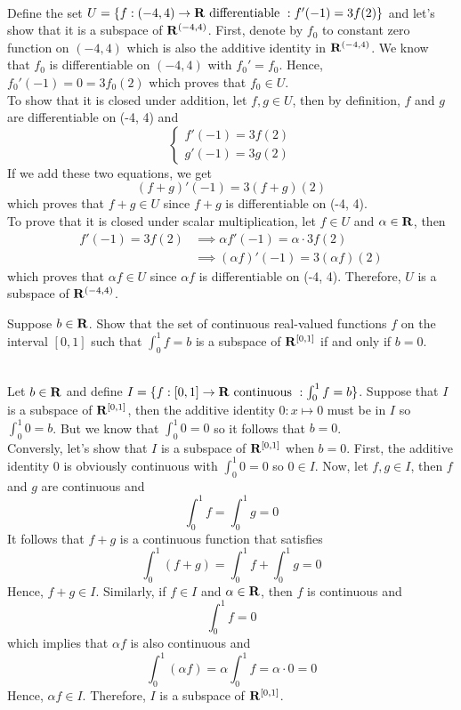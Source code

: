 \begin{solution}
    \\ Define the set $U = \{f : (-4, 4) \to \mathbf{R} \text{ differentiable } : f'(-1) = 3f(2)\}$ and let's show that it is a subspace of $\mathbf{R}^{(-4, 4)}$. First, denote by $f_0$ to constant zero function on $(-4, 4)$ which is also the additive identity in $\mathbf{R}^{(-4, 4)}$. We know that $f_0$ is differentiable on $(-4, 4)$ with $f_0' = f_0$. Hence, $f_0'(-1)= 0 = 3f_0(2)$ which proves that $f_0 \in U$.\\
    To show that it is closed under addition, let $f,g \in U$, then by definition, $f$ and $g$ are differentiable on (-4, 4) and 
    $$\begin{cases}
        f'(-1) = 3f(2) \\ g'(-1) = 3g(2)
    \end{cases}$$
    If we add these two equations, we get
    $$(f+g)'(-1) = 3(f+g)(2)$$
    which proves that $f+g \in U$ since $f+g$ is differentiable on (-4, 4).\\
    To prove that it is closed under scalar multiplication, let $f \in U$ and $\alpha \in \mathbf{R}$, then
    \begin{align*}
        f'(-1) = 3f(2) &\implies \alpha f'(-1) = \alpha \cdot 3f(2) \\
        &\implies (\alpha f)'(-1) = 3(\alpha f)(2)
    \end{align*}
    which proves that $\alpha f \in U$ since $\alpha f$ is differentiable on (-4, 4). Therefore, $U$ is a subspace of $\mathbf{R}^{(-4,4)}$. \\
\end{solution}

\begin{exercise}
    Suppose $b \in \mathbf{R}$. Show that the set of continuous real-valued functions $f$ on the interval $[0,1]$ such that $\int_{0}^{1}f = b$ is a subspace of $\mathbf{R}^{[0,1]}$ if and only if $b=0$. \\
\end{exercise}

\begin{solution}
    \\ Let $b \in \mathbf{R}$ and define $I = \{f : [0,1] \to \mathbf{R} \text{ continuous }: \int_{0}^{1}f = b \}$. Suppose that $I$ is a subspace of $\mathbf{R}^{[0,1]}$, then the additive identity $0 : x \mapsto 0$ must be in $I$ so $\int_{0}^{1}0 = b$. But we know that $\int_{0}^{1}0 = 0$ so it follows that $b=0$. \\
    Conversly, let's show that $I$ is a subspace of $\mathbf{R}^{[0,1]}$ when $b=0$. First, the additive identity $0$ is obviously continuous with $\int_{0}^{1}0 = 0$ so $0 \in I$. Now, let $f, g \in I$, then $f$ and $g$ are continuous and 
    $$\int_{0}^{1}f = \int_{0}^{1}g = 0$$
    It follows that $f+g$ is a continuous function that satisfies
    $$\int_{0}^{1}(f+g) = \int_{0}^{1}f + \int_{0}^{1}g = 0$$
    Hence, $f+g \in I$. Similarly, if $f \in I$ and $\alpha \in \mathbf{R}$, then $f$ is continuous and
    $$\int_{0}^{1}f = 0$$
    which implies that $\alpha f$ is also continuous and
    $$\int_{0}^{1}(\alpha f) = \alpha \int_{0}^{1}f = \alpha \cdot 0 = 0$$
    Hence, $\alpha f \in I$. Therefore, $I$ is a subspace of $\mathbf{R}^{[0,1]}$. \\
\end{solution}

